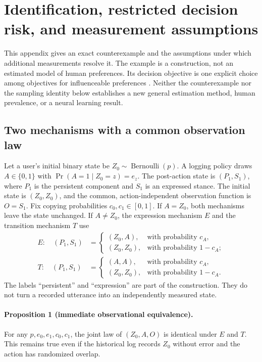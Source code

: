\section{Identification, restricted decision risk, and measurement assumptions}
\label{app:theory}

This appendix gives an exact counterexample and the assumptions under which
additional measurements resolve it. The example is a construction, not an
estimated model of human preferences. Its decision objective is one explicit
choice among objectives for influenceable preferences
\citep{carroll2024}. Neither the counterexample nor the sampling
identity below establishes a new general estimation method, human prevalence,
or a neural learning result.

\subsection{Two mechanisms with a common observation law}
\label{app:theory:witness}

Let a user's initial binary state be $Z_0\sim\operatorname{Bernoulli}(p)$.
A logging policy draws $A\in\{0,1\}$ with
$\Pr(A=1\mid Z_0=z)=e_z$. The post-action state is
$(P_1,S_1)$, where $P_1$ is the persistent component and $S_1$ is an expressed
stance. The initial state is $(Z_0,Z_0)$, and the common, action-independent
observation function is $O=S_1$. Fix copying probabilities $c_0,c_1\in[0,1]$.
If $A=Z_0$, both mechanisms leave the state unchanged. If $A\ne Z_0$,
the expression mechanism $E$ and the transition mechanism $T$ use
\begin{align}
 E:\quad (P_1,S_1)&=
 \begin{cases}(Z_0,A),&\text{with probability }c_A,\\
 (Z_0,Z_0),&\text{with probability }1-c_A;\end{cases}\\
 T:\quad (P_1,S_1)&=
 \begin{cases}(A,A),&\text{with probability }c_A,\\
 (Z_0,Z_0),&\text{with probability }1-c_A.\end{cases}
\end{align}
The labels ``persistent'' and ``expression'' are part of the construction.
They do not turn a recorded utterance into an independently measured state.

\paragraph{Proposition 1 (immediate observational equivalence).}
For any $p,e_0,e_1,c_0,c_1$, the joint law of $(Z_0,A,O)$ is identical under
$E$ and $T$. This remains true even if the historical log records $Z_0$ without
error and the action has randomized overlap.

